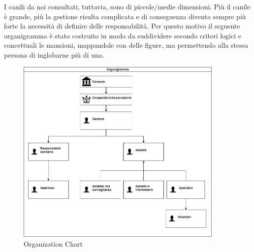         I canili da noi consultati, tuttavia, sono di piccole/medie dimensioni. Più il canile è grande, più la gestione risulta complicata e di conseguenza diventa sempre più forte la necessità di definire delle responsabilità. Per questo motivo il seguente organigramma è stato costruito in modo da suddividere secondo criteri logici e concettuali le mansioni, mappandole con delle figure, ma permettendo alla stessa persona di inglobarne più di una.
        
        \begin{figure}[ht]
            \caption{Organization Chart}
            \centering
            \includegraphics[width=0.9\textwidth]{DrawIo/organizationChart.png}
        \end{figure}